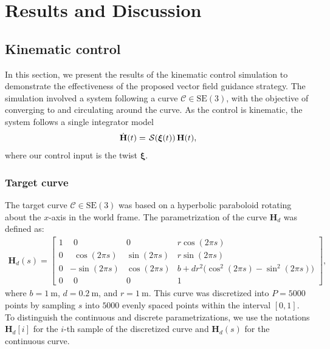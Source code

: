 \chapter{Results and Discussion}\label{ch:results}
\section{Kinematic control}
In this section, we present the results of the kinematic control simulation to demonstrate the effectiveness of the proposed vector field guidance strategy. The simulation involved a system following a curve $\mathcal{C}\in\text{SE}(3)$, with the objective of converging to and circulating around the curve. As the control is kinematic, the system follows a single integrator model
\begin{align}
    \dot{\mathbf{H}}(t) = \SL[\boldsymbol{\xi}(t)]\mathbf{H}(t),
\end{align}
where our control input is the twist $\boldsymbol{\xi}$.
\subsection{Target curve}
The target curve $\mathcal{C}\in\text{SE}(3)$ was based on a hyperbolic paraboloid rotating about the $x$-axis in the world frame. The parametrization of the curve $\mathbf{H}_d$ was defined as:
\begin{align}
    \mathbf{H}_d(s) = \begin{bmatrix}
        1 & \ \ 0 & 0 & r\cos(2\pi s)\\
        0 & \ \ \cos(2\pi s) & \sin(2\pi s) & r\sin(2\pi s)\\
        0 & -\sin(2\pi s) & \cos(2\pi s) & b + dr^2\bigl(\cos^2(2\pi s) - \sin^2(2\pi s)\bigr)\\
        0 & \ \ 0 & 0 & 1
    \end{bmatrix},
\end{align}
where $b=\qty{1}{\meter}$, $d=\qty{0.2}{\meter}$, and $r=\qty{1}{\meter}$. This curve was discretized into $P=\num{5000}$ points by sampling $s$ into $\num{5000}$ evenly spaced points within the interval $[0, 1]$. To distinguish the continuous and discrete parametrizations, we use the notations $\mathbf{H}_d[i]$ for the $i$-th sample of the discretized curve and $\mathbf{H}_d(s)$ for the continuous curve.
